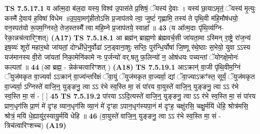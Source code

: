 \documentclass[17pt]{extarticle}
\begin{document}
                                        \textbf{ TS 7.5.17.1} \newline
                  य आ᳚त्म॒दा ब॑ल॒दा यस्य॒ विश्व॑ उ॒पास॑ते प्र॒शिषं॒ ॅयस्य॑ दे॒वाः । यस्य॑ छा॒याऽमृतं॒ ॅयस्य॑ मृ॒त्युः कस्मै॑ दे॒वाय॑ ह॒विषा॑ विधेम ॥उ॒प॒या॒मगृ॑हीतोऽसि प्र॒जाप॑तये त्वा॒ जुष्टं॑ गृह्णामि॒ तस्य॑ ते पृथि॒वी म॑हि॒मौष॑धयो॒ वन॒स्पत॑यो रू॒पम॒ग्निस्ते॒ तेज॒स्तस्मै᳚ त्वा महि॒म्ने प्र॒जाप॑तये॒ स्वाहा᳚ ॥ \textbf{  43 } \newline
                  \newline
                      (य आ᳚त्म॒दाः पृ॑थि॒व्य॑ग्नि-रेका॒न्नच॑त्वारिꣳ॒॒शत्)  \textbf{(A17)} \newline \newline
                                        \textbf{ TS 7.5.18.1} \newline
                  आ ब्रह्म॑न् ब्राह्म॒णो ब्र॑ह्मवर्च॒सी जा॑यता॒मा ऽस्मिन् रा॒ष्ट्रे रा॑ज॒न्य॑ इष॒व्यः॑ शूरो॑ महार॒थो जा॑यतां॒ दोग्ध्री॑धे॒नुर्वोढा॑ ऽन॒ड्वाना॒शुः सप्तिः॒ पुर॑न्धि॒र्योषा॑ जि॒ष्णू र॑थे॒ष्ठाः स॒भेयो॒ युवा ऽऽस्य यज॑मानस्य वी॒रो जा॑यतां निका॒मेनि॑कामे नः प॒र्जन्यो॑ वर्.षतु फ॒लिन्यो॑ न॒ ओष॑धयः पच्यन्तां ॅयोगक्षे॒मोनः॑ कल्पतां ॥ \textbf{  44} \newline
                  \newline
                      (आ ब्रह्म॒ - न्नेक॑चत्वारिꣳशत् ) \textbf{(A18)} \newline \newline
                                        \textbf{ TS 7.5.19.1} \newline
                  आऽक्रान्॑ वा॒जी पृ॑थि॒वीम॒ग्निं ॅयुज॑मकृत वा॒ज्यर्वा ऽऽक्रान्॑ वा॒ज्य॑न्तरि॑क्षं ॅवा॒युं ॅयुज॑मकृत वा॒ज्यर्वा॒ द्यां ॅवा॒ज्याऽक्रꣳ॑स्त॒ सूर्यं॒ ॅयुज॑मकृत वा॒ज्यर्वा॒ ऽग्निस्ते॑ वाजि॒न्॒ युङ्ङनु॒ त्वा ऽऽ र॑भे स्व॒स्ति मा॒ सं पा॑रय वा॒युस्ते॑ वाजि॒न्॒ युङ्ङनु॒ त्वा ऽऽ र॑भे स्व॒स्ति मा॒ सं - [  ] \textbf{  45} \newline
                  \newline
                                \textbf{ TS 7.5.19.2} \newline
                  पा॑रया ऽऽदि॒त्यस्ते॑ वाजि॒न्॒ युङ्ङनु॒ त्वा ऽऽ र॑भे स्व॒स्ति मा॒ सं पा॑रय प्राण॒धृग॑सि प्रा॒णं मे॑ दृꣳह व्यान॒धृग॑सि व्या॒नं मे॑ दृꣳहा ऽपान॒धृग॑स्यपा॒नं म॑ दृꣳह॒ चक्षु॑रसि॒ चक्षु॒र्मयि॑ धेहि॒ श्रोत्र॑मसि॒ श्रोत्रं॒ मयि॑ धे॒ह्यायु॑र॒स्यायु॒र्मयि॑ धेहि ॥ \textbf{  46} \newline
                  \newline
                      (वा॒युस्ते॑ वाजि॒न्॒ युङ्ङनु॒ त्वा ऽऽ र॑भे स्व॒स्ति मा॒ सं - त्रिच॑त्वारिꣳशच्च)  \textbf{(A19)} \newline \newline
\end{document}
